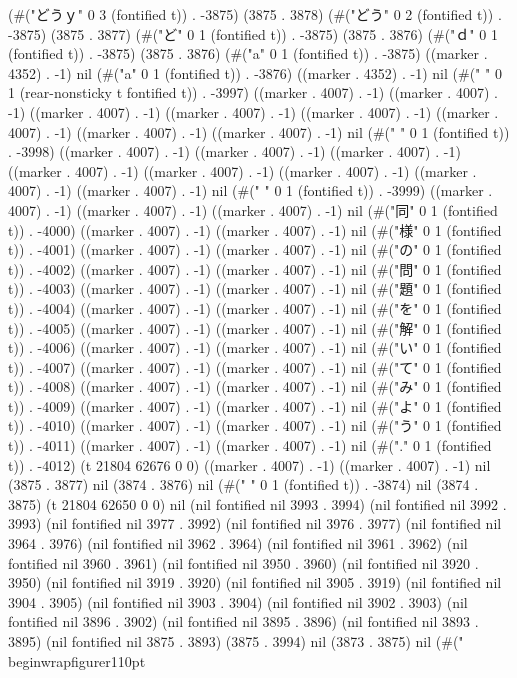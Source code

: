 (#("どうｙ" 0 3 (fontified t)) . -3875) (3875 . 3878) (#("どう" 0 2 (fontified t)) . -3875) (3875 . 3877) (#("ど" 0 1 (fontified t)) . -3875) (3875 . 3876) (#("ｄ" 0 1 (fontified t)) . -3875) (3875 . 3876) (#("a" 0 1 (fontified t)) . -3875) ((marker . 4352) . -1) nil (#("a" 0 1 (fontified t)) . -3876) ((marker . 4352) . -1) nil (#("
" 0 1 (rear-nonsticky t fontified t)) . -3997) ((marker . 4007) . -1) ((marker . 4007) . -1) ((marker . 4007) . -1) ((marker . 4007) . -1) ((marker . 4007) . -1) ((marker . 4007) . -1) ((marker . 4007) . -1) ((marker . 4007) . -1) nil (#("
" 0 1 (fontified t)) . -3998) ((marker . 4007) . -1) ((marker . 4007) . -1) ((marker . 4007) . -1) ((marker . 4007) . -1) ((marker . 4007) . -1) ((marker . 4007) . -1) ((marker . 4007) . -1) ((marker . 4007) . -1) nil (#("
" 0 1 (fontified t)) . -3999) ((marker . 4007) . -1) ((marker . 4007) . -1) ((marker . 4007) . -1) nil (#("同" 0 1 (fontified t)) . -4000) ((marker . 4007) . -1) ((marker . 4007) . -1) nil (#("様" 0 1 (fontified t)) . -4001) ((marker . 4007) . -1) ((marker . 4007) . -1) nil (#("の" 0 1 (fontified t)) . -4002) ((marker . 4007) . -1) ((marker . 4007) . -1) nil (#("問" 0 1 (fontified t)) . -4003) ((marker . 4007) . -1) ((marker . 4007) . -1) nil (#("題" 0 1 (fontified t)) . -4004) ((marker . 4007) . -1) ((marker . 4007) . -1) nil (#("を" 0 1 (fontified t)) . -4005) ((marker . 4007) . -1) ((marker . 4007) . -1) nil (#("解" 0 1 (fontified t)) . -4006) ((marker . 4007) . -1) ((marker . 4007) . -1) nil (#("い" 0 1 (fontified t)) . -4007) ((marker . 4007) . -1) ((marker . 4007) . -1) nil (#("て" 0 1 (fontified t)) . -4008) ((marker . 4007) . -1) ((marker . 4007) . -1) nil (#("み" 0 1 (fontified t)) . -4009) ((marker . 4007) . -1) ((marker . 4007) . -1) nil (#("よ" 0 1 (fontified t)) . -4010) ((marker . 4007) . -1) ((marker . 4007) . -1) nil (#("う" 0 1 (fontified t)) . -4011) ((marker . 4007) . -1) ((marker . 4007) . -1) nil (#("." 0 1 (fontified t)) . -4012) (t 21804 62676 0 0) ((marker . 4007) . -1) ((marker . 4007) . -1) nil (3875 . 3877) nil (3874 . 3876) nil (#(" " 0 1 (fontified t)) . -3874) nil (3874 . 3875) (t 21804 62650 0 0) nil (nil fontified nil 3993 . 3994) (nil fontified nil 3992 . 3993) (nil fontified nil 3977 . 3992) (nil fontified nil 3976 . 3977) (nil fontified nil 3964 . 3976) (nil fontified nil 3962 . 3964) (nil fontified nil 3961 . 3962) (nil fontified nil 3960 . 3961) (nil fontified nil 3950 . 3960) (nil fontified nil 3920 . 3950) (nil fontified nil 3919 . 3920) (nil fontified nil 3905 . 3919) (nil fontified nil 3904 . 3905) (nil fontified nil 3903 . 3904) (nil fontified nil 3902 . 3903) (nil fontified nil 3896 . 3902) (nil fontified nil 3895 . 3896) (nil fontified nil 3893 . 3895) (nil fontified nil 3875 . 3893) (3875 . 3994) nil (3873 . 3875) nil (#("\\begin{wrapfigure}{r}{110pt}
